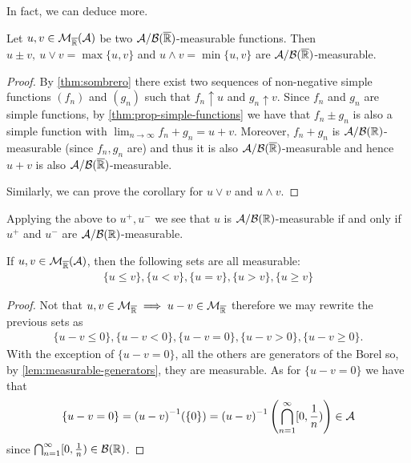 In fact, we can deduce more.

\begin{cor}
	\label{cor:properties-measurable}
	Let $u, v \in \mathcal{M}_{\overline{\mathbb{R}}}(\mathcal{A})$ be two $\mathcal{A}/\mathcal{B}({\overline{\mathbb{R}}})$-measurable functions. Then $u \pm v,\ u \lor v = \max\{u, v\}$ and $u \land v = \min\{u, v\}$ are $\mathcal{A}/\mathcal{B}({\overline{\mathbb{R}}})$-measurable.
\end{cor}

\begin{proof}
	By \autoref{thm:sombrero} there exist two sequences of non-negative simple functions $(f_n)$ and $(g_n)$ such that $f_n \uparrow u$ and $g_n \uparrow v$. Since $f_n$ and $g_n$ are simple functions, by \autoref{thm:prop-simple-functions} we have that $f_n \pm g_n$ is also a simple function with $\lim_{n\to \infty} f_n + g_n = u + v$. Moreover, $f_n + g_n$ is $\mathcal{A}/\mathcal{B}(\mathbb{R})$-measurable (since $f_n, g_n$ are) and thus it is also $\mathcal{A}/\mathcal{B}({\overline{\mathbb{R}}})$-measurable and hence $u+v$ is also $\mathcal{A}/\mathcal{B}({\overline{\mathbb{R}}})$-measurable.
	
	Similarly, we can prove the corollary for $u\lor v$ and $u \land v$.
\end{proof}

\begin{remark}
	Applying the above to $u^+, u^-$ we see that $u$ is $\mathcal{A}/\mathcal{B}(\mathbb{R})$-measurable if and only if $u^+$ and $u^-$ are $\mathcal{A}/\mathcal{B}(\mathbb{R})$-measurable.
\end{remark}

\begin{cor}
	If $u, v \in \mathcal{M}_{\overline{\mathbb{R}}}(\mathcal{A})$, then the following sets are all measurable:
	\begin{align*}
		\{u \leq v\}, \{u < v\}, \{u = v\}, \{u > v\}, \{u \geq v\}
	\end{align*}
\end{cor}

\begin{proof}
	Not that $u, v\in \mathcal{M}_{\overline{\mathbb{R}}} \implies u - v \in \mathcal{M}_{\overline{\mathbb{R}}}$ therefore we may rewrite the previous sets as
	\begin{align*}
		\{u - v \leq 0\}, \{u - v < 0\}, \{u - v = 0\}, \{u - v > 0\}, \{u - v \geq 0\}.
	\end{align*}
	With the exception of $\{u - v = 0\}$, all the others are generators of the Borel \siga so, by \autoref{lem:measurable-generators}, they are measurable. As for $\{u - v = 0\}$ we have that
	\begin{align*}
		\{u - v = 0\}
		= {(u - v)}^{-1}(\{0\})
		= {(u - v)}^{-1}\left(\bigcap_{n = 1}^\infty [0, \frac{1}{n})\right) \in \mathcal{A}
	\end{align*}
	since $\bigcap_{n = 1}^\infty [0, \frac{1}{n}) \in \mathcal{B}(\mathbb{R})$.
\end{proof}


